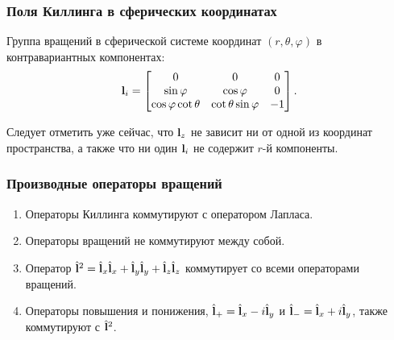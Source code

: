 \documentclass[compress]{beamer}
\begin{document}

    \begin{frame}\frametitle{Поля Киллинга в сферических координатах}

        Группа вращений в сферической системе координат $(r,\theta,\varphi)$ в контравариантных компонентах:
        \begin{equation*}
            \mathbf{l}_i
            =
            \begin{bmatrix}
                0
                    & 0
                    & 0 \\
                \sin\varphi
                    & \cos\varphi
                    & 0 \\
                \cos\varphi \cot\theta
                    & \cot\theta \sin\varphi
                    & - 1
            \end{bmatrix}
            .
        \end{equation*}

         Следует отметить уже сейчас, что $\mathbf{l}_z$ не зависит ни от одной из координат пространства, а также что ни один $\mathbf{l}_i$ не содержит $r$-й компоненты.

    \end{frame}


    \begin{frame}\frametitle{Производные операторы вращений}

        \begin{enumerate}
            \item Операторы Киллинга коммутируют с оператором Лапласа.

            \item Операторы вращений не коммутируют между собой.

            \item Оператор $\hat{\mathbf{l}}^2 = \hat{\mathbf{l}}_x \hat{\mathbf{l}}_x + \hat{\mathbf{l}}_y \hat{\mathbf{l}}_y + \hat{\mathbf{l}}_z \hat{\mathbf{l}}_z$ коммутирует со всеми операторами вращений.

            \item Операторы повышения и понижения, $\hat{\mathbf{l}}_{+} = \hat{\mathbf{l}}_x - i\hat{\mathbf{l}}_y$ и $\hat{\mathbf{l}}_{-} = \hat{\mathbf{l}}_x + i\hat{\mathbf{l}}_y$, также коммутируют с $\hat{\mathbf{l}}^2$.
        \end{enumerate}

    \end{frame}
\end{document}

